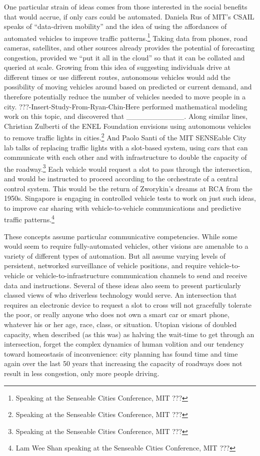 One particular strain of ideas comes from those interested in the
social benefits that would accrue, if only cars could be automated.
Daniela Rus of MIT's CSAIL speaks of ``data-driven mobility'' and the
idea of using the affordances of automated vehicles to improve traffic
patterns.\footnote{Speaking at the Senseable Cities Conference, MIT
  ???} Taking data from phones, road cameras, satellites, and other
sources already provides the potential of forecasting congestion,
provided we ``put it all in the cloud'' so that it can be collated and
queried at scale. Growing from this idea of suggesting individuals drive at
different times or use different routes, autonomous vehicles would add
the possibility of moving vehicles around based on predicted or
current demand, and therefore potentially reduce the number of
vehicles needed to move people in a city.
???-Insert-Study-From-Ryan-Chin-Here performed mathematical modeling
work on this topic, and discovered that ___________. Along similar
lines, Christian Zulberti of the ENEL Foundation envisions using
autonomous vehicles to remove traffic lights in
cities.\footnote{Speaking at the Senseable Cities Conference, MIT ???} And Paolo
Santi of the MIT SENSEable City lab talks of replacing traffic lights
with a slot-based system, using cars that can communicate with each
other and with infrastructure to double the capacity of the
roadway.\footnote{Speaking at the Senseable Cities Conference, MIT
  ???} Each vehicle would request a slot to pass through the
intersection, and would be instructed to proceed according to the
orchestrate of a central control system. This would be the return of
Zworykin's dreams at RCA from the 1950s. Singapore is engaging in
controlled vehicle tests to work on just such ideas, to improve car
sharing with vehicle-to-vehicle communications and predictive traffic
patterns.\footnote{Lam Wee Shan speaking at the Senseable Cities
  Conference, MIT ???} 

These concepts assume particular communicative competencies. While
some would seem to require fully-automated vehicles, other
visions are amenable to a variety of different types of automation.
But all assume varying levels of persistent, networked surveillance of
vehicle positions, and require vehicle-to-vehicle or
vehicle-to-infrastructure communication channels to send and receive
data and instructions. Several of these ideas also seem to present
particularly classed views of who driverless technology would serve.
An intersection that requires an electronic device to request a slot
to cross will not gracefully tolerate the poor, or really anyone who
does not own a smart car or smart phone, whatever his or her age,
race, class, or situation. Utopian visions of doubled capacity, when
described (as this was) as halving the wait-time to get through an
intersection, forget the complex dynamics of human volition and our
tendency toward homeostasis of inconvenience: city planning has found
time and time again over the last 50 years that increasing the
capacity of roadways does not result in less congestion, only more
people driving.\cite{???-somethingFromMitchell} 

